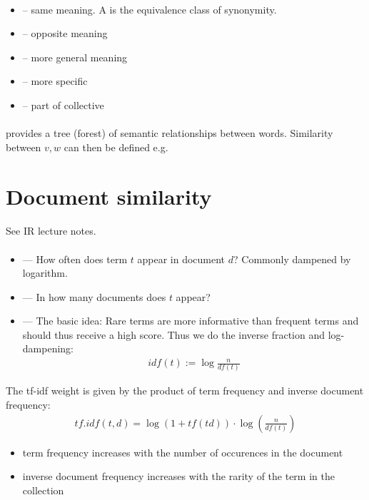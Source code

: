 \documentclass[10pt,twocolumn]{article}
\begin{document}
\paragraph{} 
\begin{itemize}
\item {} -- same meaning. A  is the equivalence class of synonymity.
\item {} -- opposite meaning
\item {} -- more general meaning
\item {} -- more specific
\item {} -- part of collective
\end{itemize}

\paragraph{} provides a tree (forest) of semantic relationships
between words. Similarity between $v,w$ can then be defined e.g. \todo


\section{Document similarity}

\paragraph{} See IR lecture notes.

\paragraph{} \begin{itemize}
\item {} --- How often does term $t$ appear in
  document $d$? Commonly dampened by logarithm.
\item {} --- In how many documents does $t$ appear?
\item {}  ---
  The basic idea: Rare terms are more informative
  than frequent terms and should thus receive a high score.  Thus we do the
  inverse fraction and log-dampening:
  \begin{align*}
    \mathit{idf}(t) := \log \frac{n}{\mathit{df}(t)}
  \end{align*}
\end{itemize}
The tf-idf weight is given by the product of term frequency and inverse document
frequency:
\begin{align*}
  \mathit{tf.idf}(t,d) = \log(1 + \mathit{tf}(td)) \cdot \log \left( \frac{n}{\mathit{df}(t)} \right)
\end{align*}
\begin{itemize}
\item term frequency increases with the number of occurences in the document
\item inverse document frequency increases with the rarity of the term in the collection
\end{itemize}
\end{document}
